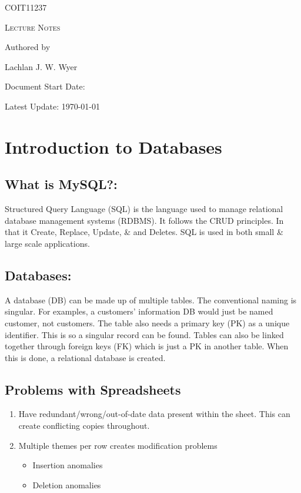 \documentclass[a5paper]{article}
\date{11\textsuperscript{th} of June 2026}
\begin{document}
	\begin{titlepage}
		\centering
		{\Huge \textsc{COIT11237}\par}
		\vspace{1cm}
		{\Large \textsc{Lecture Notes}\par}
		\vspace{2.5cm}
		\vfill
		Authored by\par
		Lachlan J. W. Wyer
		\vfill
		\makeatletter
		{\large Document Start Date: \@date \par}
		\makeatother
		{\large Latest Update: \today\par}
	\end{titlepage}
	\tableofcontents
	\pagebreak

	\section{Introduction to Databases}
	\subsection{What is MySQL?:}
	Structured Query Language (SQL) is the language used to manage relational database management systems (RDBMS). It follows the CRUD principles. In that it Create, Replace, Update, \& and Deletes. SQL is used in both small \& large scale applications.
	\subsection{Databases:}
	A database (DB) can be made up of multiple tables. The conventional naming is singular. For examples, a customers' information DB would just be named customer, not customers. The table also needs a primary key (PK) as a unique identifier. This is so a singular record can be found. Tables can also be linked together through foreign keys (FK) which is just a PK in another table. When this is done, a relational database is created.
	\subsection{Problems with Spreadsheets}
	\begin{enumerate}
		\item Have redundant/wrong/out-of-date data present within the sheet. This can create conflicting copies throughout.
		\item Multiple themes per row creates modification problems
		\begin{itemize}
			\item Insertion anomalies
			\item Deletion anomalies
		\end{itemize}
	\end{enumerate}
\end{document}
